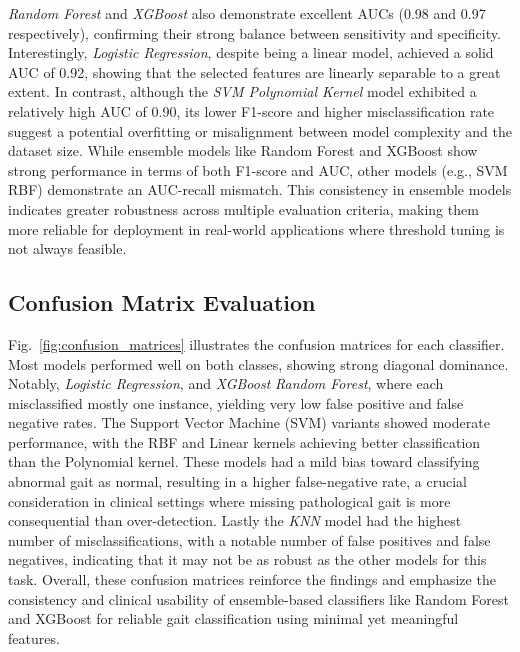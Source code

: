 \textit{Random Forest} and \textit{XGBoost} also demonstrate excellent AUCs (0.98 and 0.97 respectively), confirming their strong balance between sensitivity 
and specificity. Interestingly, \textit{Logistic Regression}, despite being a linear model, achieved a solid AUC of 0.92, showing that the selected features are 
linearly separable to a great extent. In contrast, although the \textit{SVM Polynomial Kernel} model exhibited a relatively high AUC of 0.90, its 
lower F1-score and higher misclassification rate suggest a potential overfitting or misalignment between model complexity and the dataset size. 
While ensemble models like Random Forest and XGBoost show strong performance in terms of both F1-score and AUC, other models (e.g., SVM RBF) demonstrate an 
AUC-recall mismatch. This consistency in ensemble models indicates greater robustness across multiple evaluation criteria, making them more reliable for 
deployment in real-world applications where threshold tuning is not always feasible.

\subsection{Confusion Matrix Evaluation}
Fig.~\ref{fig:confusion_matrices} illustrates the confusion matrices for each classifier. Most models performed well on both classes, showing strong 
diagonal dominance. Notably, \textit{Logistic Regression}, and \textit{XGBoost} \textit{Random Forest}, where each misclassified mostly one instance, 
yielding very low false positive and false negative rates. The Support Vector Machine (SVM) variants showed moderate performance, with the RBF and Linear kernels 
achieving better classification than the Polynomial kernel. These models had a mild bias toward classifying abnormal gait as normal, resulting in a higher 
false-negative rate, a crucial consideration in clinical settings where missing pathological gait is more consequential than over-detection.
Lastly the \textit{KNN} model had the highest number of misclassifications, with a notable number of false positives and false negatives, indicating that it 
may not be as robust as the other models for this task. Overall, these confusion matrices reinforce the findings and emphasize the consistency and clinical 
usability of ensemble-based classifiers like Random Forest and XGBoost for reliable gait classification using minimal yet meaningful features.

